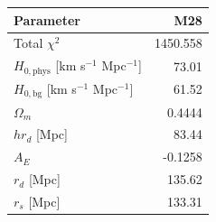 \begin{tabular}{lr}
\toprule
Parameter & M28 \\
\midrule
Total $\chi^{2}$ & 1450.558 \\
$H_{0,\mathrm{phys}}$ [km s$^{-1}$ Mpc$^{-1}$] & 73.01 \\
$H_{0,\mathrm{bg}}$ [km s$^{-1}$ Mpc$^{-1}$] & 61.52 \\
$\Omega_{m}$ & 0.4444 \\
$h r_d$ [Mpc] & 83.44 \\
$A_{E}$ & -0.1258 \\
$r_{d}$ [Mpc] & 135.62 \\
$r_{s}$ [Mpc] & 133.31 \\
\bottomrule
\end{tabular}

